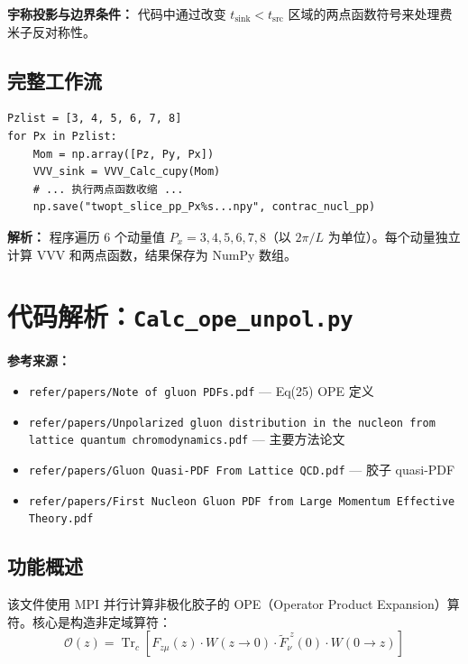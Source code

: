 \documentclass[12pt,a4paper]{ctexart}
\begin{document}
\textbf{宇称投影与边界条件：} 代码中通过改变 $t_{\text{sink}} < t_{\text{src}}$ 区域的两点函数符号来处理费米子反对称性。

\subsection{完整工作流}

\begin{lstlisting}[caption={主循环：遍历动量}]
Pzlist = [3, 4, 5, 6, 7, 8]
for Px in Pzlist:
    Mom = np.array([Pz, Py, Px])
    VVV_sink = VVV_Calc_cupy(Mom)
    # ... 执行两点函数收缩 ...
    np.save("twopt_slice_pp_Px%s...npy", contrac_nucl_pp)
\end{lstlisting}

\textbf{解析：}
程序遍历 6 个动量值 $P_x = 3,4,5,6,7,8$（以 $2\pi/L$ 为单位）。每个动量独立计算 VVV 和两点函数，结果保存为 NumPy 数组。

\section{代码解析：\texttt{Calc\_ope\_unpol.py}}
\label{sec:ope}

\textbf{参考来源：}
\begin{itemize}
    \item \texttt{refer/papers/Note of gluon PDFs.pdf} — Eq(25) OPE 定义
    \item \texttt{refer/papers/Unpolarized gluon distribution in the nucleon from lattice quantum chromodynamics.pdf} — 主要方法论文
    \item \texttt{refer/papers/Gluon Quasi-PDF From Lattice QCD.pdf} — 胶子 quasi-PDF
    \item \texttt{refer/papers/First Nucleon Gluon PDF from Large Momentum Effective Theory.pdf}
\end{itemize}

\subsection{功能概述}

该文件使用 MPI 并行计算非极化胶子的 OPE（Operator Product Expansion）算符。核心是构造非定域算符：
\begin{equation}
\mathcal{O}(z) = \operatorname{Tr}_c\left[ F_{z\mu}(z) \cdot W(z \to 0) \cdot \tilde{F}_{\nu}^{\;z}(0) \cdot W(0 \to z) \right]
\end{equation}
\end{document}
